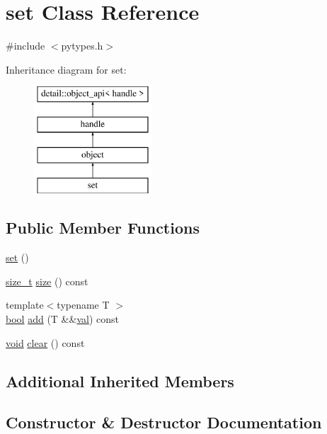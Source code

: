 \hypertarget{classset}{}\section{set Class Reference}
\label{classset}


{\ttfamily \#include $<$pytypes.\+h$>$}

Inheritance diagram for set\+:\begin{figure}[H]
\begin{center}
\leavevmode
\includegraphics[height=4.000000cm]{classset}
\end{center}
\end{figure}
\subsection*{Public Member Functions}
\begin{DoxyCompactItemize}
\item 
\mbox{\hyperlink{classset_a9a9e7ac66eda015ed84f790dda70c0a4}{set}} ()
\item 
\mbox{\hyperlink{detail_2common_8h_a801d6a451a01953ef8cbae6feb6a3638}{size\+\_\+t}} \mbox{\hyperlink{classset_a3984afa9c391124b55643dee185c18a6}{size}} () const
\item 
{\footnotesize template$<$typename T $>$ }\\\mbox{\hyperlink{asdl_8h_af6a258d8f3ee5206d682d799316314b1}{bool}} \mbox{\hyperlink{classset_a3ffbfe51196f7032c1605c10a1cfe35a}{add}} (T \&\&\mbox{\hyperlink{_s_d_l__opengl__glext_8h_a26942fd2ed566ef553eae82d2c109c8f}{val}}) const
\item 
\mbox{\hyperlink{_s_d_l__opengles2__gl2ext_8h_ae5d8fa23ad07c48bb609509eae494c95}{void}} \mbox{\hyperlink{classset_ad19a86d7faa035b3561835fcb3cef758}{clear}} () const
\end{DoxyCompactItemize}
\subsection*{Additional Inherited Members}


\subsection{Constructor \& Destructor Documentation}
\mbox{\label{classset_a9a9e7ac66eda015ed84f790dda70c0a4}} 
